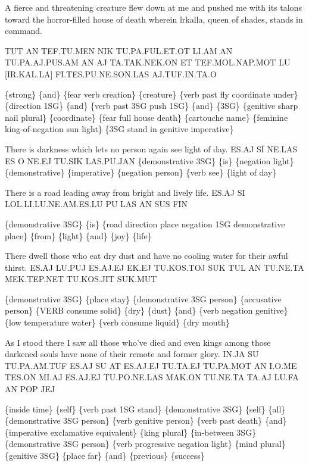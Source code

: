 {{ 
 

A fierce and threatening creature flew down at me and pushed me with its talons toward the horror-filled house of death wherein lrkalla, queen of shades, stands in command.  

TUT AN TEF.TU.MEN NIK TU.PA.FUL.ET.OT LI.AM AN TU.PA.AJ.PUS.AM AN AJ TA.TAK.NEK.ON ET TEF.MOL.NAP.MOT LU [IR.KAL.LA] FI.TES.PU.NE.SON.LAS AJ.TUF.IN.TA.O 

\{strong\} \{and\} \{fear verb creation\} \{creature\} \{verb past fly coordinate under\} \{direction 1SG\} \{and\} \{verb past 3SG push 1SG\} \{and\} \{3SG\} \{genitive sharp nail plural\} \{coordinate\} \{fear full house death\} \{cartouche name\} \{feminine king-of-negation sun light\} \{3SG stand in genitive imperative\} 

 
 

There is darkness which lets no person again see light of day.  
 ES.AJ SI NE.LAS ES O NE.EJ TU.SIK LAS.PU.JAN 
 \{demonstrative 3SG\} \{is\} \{negation light\} \{demonstrative\} \{imperative\} \{negation person\} \{verb see\} \{light of day\} 

 
 

There is a road leading away from bright and lively life.  
 ES.AJ SI LOL.LI.LU.NE.AM.ES.LU PU LAS AN SUS FIN 

\{demonstrative 3SG\} \{is\} \{road direction place negation 1SG demonstrative place\} \{from\} \{light\} \{and\} \{joy\} \{life\} 

 
 

There dwell those who eat dry dust and have no cooling water for their awful thirst.  
 ES.AJ LU.PUJ ES.AJ.EJ EK.EJ TU.KOS.TOJ SUK TUL AN TU.NE.TA MEK.TEP.NET TU.KOS.JIT SUK.MUT 

\{demonstrative 3SG\} \{place stay\} \{demonstrative 3SG person\} \{accusative person\} \{VERB consume solid\} \{dry\} \{dust\} \{and\} \{verb negation genitive\} \{low temperature water\} \{verb consume liquid\} \{dry mouth\} 

 
 

 
 

As I stood there I saw all those who've died and even kings among those darkened souls have none of their remote and former glory. 
 IN.JA SU TU.PA.AM.TUF ES.AJ SU AT ES.AJ.EJ TU.TA.EJ TU.PA.MOT AN I.O.ME TES.ON MI.AJ ES.AJ.EJ TU.PO.NE.LAS MAK.ON TU.NE.TA TA.AJ LU.FA AN POP JEJ 

\{inside time\} \{self\} \{verb past 1SG stand\} \{demonstrative 3SG\} \{self\} \{all\} \{demonstrative 3SG person\} \{verb genitive person\} \{verb past death\} \{and\} \{imperative exclamative equivalent\} \{king plural\} \{in-between 3SG\} \{demonstrative 3SG person\} \{verb progressive negation light\} \{mind plural\} \{genitive 3SG\} \{place far\} \{and\} \{previous\} \{success\} 

}}
